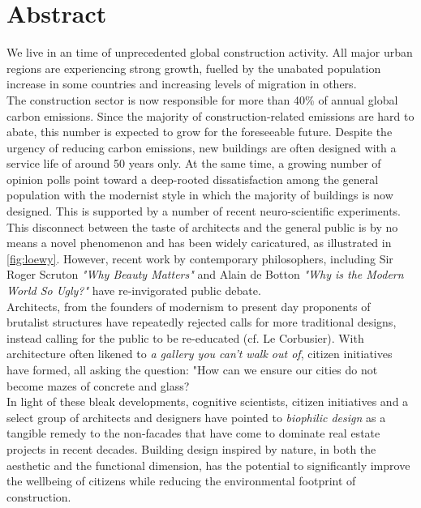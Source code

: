 \documentclass{article}
\begin{document}
\clearpage
\section{\centering Abstract}
\label{sec:abstract}

\begin{minipage}{0.625\textwidth}

We live in an time of unprecedented global construction activity. All major urban regions are experiencing strong growth, fuelled by the unabated population increase in some countries and increasing levels of migration in others. \\

The construction sector is now responsible for more than 40\% of annual global carbon emissions. Since the majority of construction-related emissions are hard to abate, this number is expected to grow for the foreseeable future. Despite the urgency of reducing carbon emissions, new buildings are often designed with a service life of around 50 years only. At the same time, a growing number of opinion polls point toward a deep-rooted dissatisfaction among the general population with the modernist style in which the majority of buildings is now designed. This is supported by a number of recent neuro-scientific experiments. \\

This disconnect between the taste of architects and the general public is by no means a novel phenomenon and has been widely caricatured, as illustrated in \cref{fig:loewy}. However, recent work by contemporary philosophers, including Sir Roger Scruton \textit{"Why Beauty Matters"} and Alain de Botton \textit{"Why is the Modern World So Ugly?"} have re-invigorated public debate. \\

Architects, from the founders of modernism to present day proponents of brutalist structures have repeatedly rejected calls for more traditional designs, instead calling for the public to be re-educated (cf. Le Corbusier). With architecture often likened to \textit{a gallery you can't walk out of}, citizen initiatives have formed, all asking the question: "How can we ensure our cities do not become mazes of concrete and glass? \\

In light of these bleak developments, cognitive scientists, citizen initiatives and a select group of architects and designers have pointed to \textit{biophilic design} as a tangible remedy to the non-facades that have come to dominate real estate projects in recent decades. Building design inspired by nature, in both the aesthetic and the functional dimension, has the potential to significantly improve the wellbeing of citizens while reducing the environmental footprint of construction. \\


\end{minipage}
\end{document}
